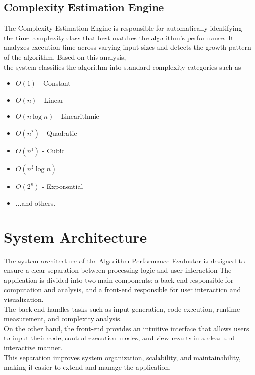 \documentclass[12pt]{article}
\begin{document}
\vspace{1cm}
\subsection{Complexity Estimation Engine}

The Complexity Estimation Engine is responsible for automatically identifying the time complexity class that best matches the algorithm’s performance. It analyzes execution time across varying input sizes and detects the growth pattern of the algorithm.
Based on this analysis,\\
the system classifies the algorithm into standard complexity categories such as

\begin{itemize}
\item $O(1)$ - Constant
\item $O(n)$ - Linear
\item $O(n \log n)$ - Linearithmic
\item $O(n^2)$ - Quadratic
\item $O(n^3)$ - Cubic
\item $O(n^2 \log n)$
\item $O(2^n)$ - Exponential
\item ...and others.
\end{itemize}

\section{System Architecture}

The system architecture of the Algorithm Performance Evaluator is designed to ensure a clear separation between processing logic and user interaction
The application is divided into two main components: 
a back-end responsible for computation and analysis, 
and a front-end responsible for user interaction and visualization.\\

The back-end handles tasks such as input generation, code execution, runtime measurement, and complexity analysis.\\
On the other hand, the front-end provides an intuitive interface that allows users to input their code, control execution modes, 
and view results in a clear and interactive manner.\\

This separation improves system organization, scalability, and maintainability, making it easier to extend and manage the application.
\end{document}

